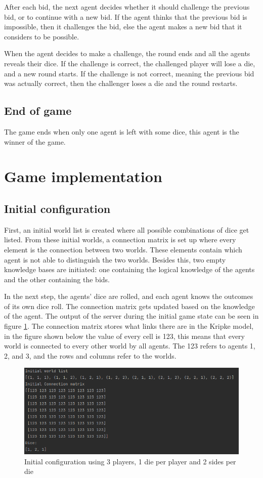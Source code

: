 \documentclass{article}
\begin{document}
After each bid, the next agent decides whether it should challenge the previous bid, or to continue with a new bid. If the agent thinks that the previous bid is impossible, then it challenges the bid, else the agent makes a new bid that it considers to be possible. 

When the agent decides to make a challenge, the round ends and all the agents reveals their dice. If the challenge is correct, the challenged player will lose a die, and a new round starts. If the challenge is not correct, meaning the previous bid was actually correct, then the challenger loses a die and the round restarts.

\subsection*{End of game} %
The game ends when only one agent is left with some dice, this agent is the winner of the game.

\section*{Game implementation}
\subsection*{Initial configuration}
First, an initial world list is created where all possible combinations of dice get listed. From these initial worlds, a connection matrix is set up where every element is the connection between two worlds. These elements contain which agent is not able to distinguish the two worlds. Besides this, two empty knowledge bases are initiated: one containing the logical knowledge of the agents and the other containing the bids.

In the next step, the agents’ dice are rolled, and each agent knows the outcomes of its own dice roll. The connection matrix gets updated based on the knowledge of the agent. The output of the server during the initial game state can be seen in figure \ref{fig:initc}. The connection matrix stores what links there are in the Kripke model, in the figure shown below the value of every cell is 123, this means that every world is connected to every other world by all agents. The 123 refers to agents 1, 2, and 3, and the rows and columns refer to the worlds.
\begin{figure}[h!]
    \centering
    \includegraphics[width=\textwidth]{img/initialconfig.png}
    \caption{Initial configuration using 3 players, 1 die per player and 2 sides per die}
    \label{fig:initc}
\end{figure}
\end{document}
